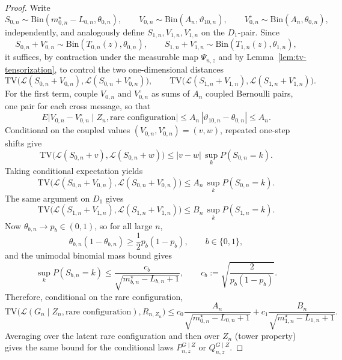 \documentclass{article}
\begin{document}
\begin{proof}
Write
\[
S_{0,n}\sim \mathrm{Bin}(m_{0,n}^\star-L_{0,n},\theta_{0,n}),
\qquad
V_{0,n}\sim \mathrm{Bin}(A_n,\vartheta_{10,n}),
\qquad
V_{0,n}^\circ\sim \mathrm{Bin}(A_n,\theta_{0,n}),
\]
independently, and analogously define $S_{1,n},V_{1,n},V_{1,n}^\circ$ on the $D_1$-pair. Since
\[
S_{0,n}+V_{0,n}^\circ\sim \mathrm{Bin}(T_{0,n}(z),\theta_{0,n}),
\qquad
S_{1,n}+V_{1,n}^\circ\sim \mathrm{Bin}(T_{1,n}(z),\theta_{1,n}),
\]
it suffices, by contraction under the measurable map $\Psi_{n,z}$ and by Lemma~\ref{lem:tv-tensorization}, to control the two one-dimensional distances
\[
\mathrm{TV}\bigl(\mathcal L(S_{0,n}+V_{0,n}),\mathcal L(S_{0,n}+V_{0,n}^\circ)\bigr),
\qquad
\mathrm{TV}\bigl(\mathcal L(S_{1,n}+V_{1,n}),\mathcal L(S_{1,n}+V_{1,n}^\circ)\bigr).
\]
For the first term, couple $V_{0,n}$ and $V_{0,n}^\circ$ as sums of $A_n$ coupled Bernoulli pairs, one pair for each cross message, so that
\[
E\bigl|V_{0,n}-V_{0,n}^\circ\mid Z_n,\text{rare configuration}\bigr|
\le A_n\,|\vartheta_{10,n}-\theta_{0,n}|
\le A_n.
\]
Conditional on the coupled values $(V_{0,n},V_{0,n}^\circ)=(v,w)$, repeated one-step shifts give
\[
\mathrm{TV}\bigl(\mathcal L(S_{0,n}+v),\mathcal L(S_{0,n}+w)\bigr)
\le |v-w|\,\sup_k P(S_{0,n}=k).
\]
Taking conditional expectation yields
\[
\mathrm{TV}\bigl(\mathcal L(S_{0,n}+V_{0,n}),\mathcal L(S_{0,n}+V_{0,n}^\circ)\bigr)
\le A_n\,\sup_k P(S_{0,n}=k).
\]
The same argument on $D_1$ gives
\[
\mathrm{TV}\bigl(\mathcal L(S_{1,n}+V_{1,n}),\mathcal L(S_{1,n}+V_{1,n}^\circ)\bigr)
\le B_n\,\sup_k P(S_{1,n}=k).
\]
Now $\theta_{b,n}\to p_b\in(0,1)$, so for all large $n$,
\[
\theta_{b,n}(1-\theta_{b,n})\ge \frac12 p_b(1-p_b),
\qquad b\in\{0,1\},
\]
and the unimodal binomial mass bound gives
\[
\sup_k P(S_{b,n}=k)
\le \frac{c_b}{\sqrt{m_{b,n}^\star-L_{b,n}+1}},
\qquad
c_b:=\sqrt{\frac{2}{p_b(1-p_b)}}.
\]
Therefore, conditional on the rare configuration,
\begin{equation}
\mathrm{TV}\bigl(\mathcal L(G_n\mid Z_n,\text{rare configuration}),R_{n,Z_n}\bigr)
\le c_0\frac{A_n}{\sqrt{m_{0,n}^\star-L_{0,n}+1}}+c_1\frac{B_n}{\sqrt{m_{1,n}^\star-L_{1,n}+1}}.
\label{eq:B3-conditional-bound}
\end{equation}
Averaging over the latent rare configuration and then over $Z_n$ (tower property) gives the same bound for the conditional laws $P_{n,z}^{G\mid Z}$ or $Q_{n,z}^{G\mid Z}$.


\end{proof}
\end{document}
